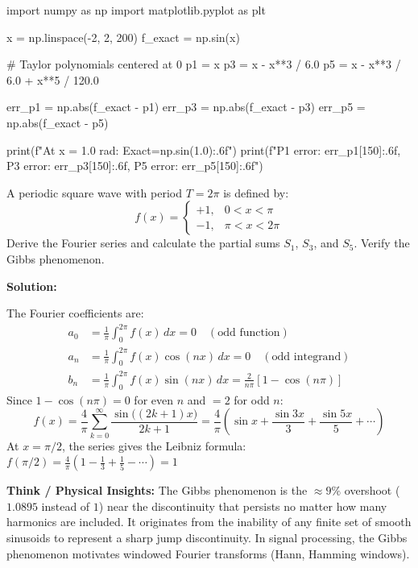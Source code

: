 \begin{pythonbox}
import numpy as np
import matplotlib.pyplot as plt

x = np.linspace(-2, 2, 200)
f_exact = np.sin(x)

# Taylor polynomials centered at 0
p1 = x
p3 = x - x**3 / 6.0
p5 = x - x**3 / 6.0 + x**5 / 120.0

err_p1 = np.abs(f_exact - p1)
err_p3 = np.abs(f_exact - p3)
err_p5 = np.abs(f_exact - p5)

print(f"At x = 1.0 rad: Exact={np.sin(1.0):.6f}")
print(f"P1 error: {err_p1[150]:.6f}, P3 error: {err_p3[150]:.6f}, P5 error: {err_p5[150]:.6f}")
\end{pythonbox}

\begin{psctexample}
A periodic square wave with period $T = 2\pi$ is defined by:
\[
f(x) = \begin{cases} +1, & 0 < x < \pi \\ -1, & \pi < x < 2\pi \end{cases}
\]
Derive the Fourier series and calculate the partial sums $S_1$, $S_3$, and $S_5$. Verify the Gibbs phenomenon.

\textbf{Solution:}

The Fourier coefficients are:
\begin{align}
a_0 &= \frac{1}{\pi}\int_0^{2\pi} f(x)\,dx = 0 \quad (\text{odd function}) \\
a_n &= \frac{1}{\pi}\int_0^{2\pi} f(x)\cos(nx)\,dx = 0 \quad (\text{odd integrand})\\
b_n &= \frac{1}{\pi}\int_0^{2\pi} f(x)\sin(nx)\,dx = \frac{2}{n\pi}[1 - \cos(n\pi)]
\end{align}
Since $1 - \cos(n\pi) = 0$ for even $n$ and $= 2$ for odd $n$:
\begin{equation}
\boxed{f(x) = \frac{4}{\pi}\sum_{k=0}^{\infty} \frac{\sin\bigl((2k+1)x\bigr)}{2k+1} = \frac{4}{\pi}\left(\sin x + \frac{\sin 3x}{3} + \frac{\sin 5x}{5} + \cdots\right)}
\end{equation}
At $x = \pi/2$, the series gives the Leibniz formula: $f(\pi/2) = \frac{4}{\pi}(1 - \frac{1}{3} + \frac{1}{5} - \cdots) = 1$ \checkmark

\textbf{\color{rbruNavy}Think / Physical Insights:}
The Gibbs phenomenon is the $\approx 9\%$ overshoot ($1.0895$ instead of $1$) near the discontinuity that persists no matter how many harmonics are included. It originates from the inability of any finite set of smooth sinusoids to represent a sharp jump discontinuity. In signal processing, the Gibbs phenomenon motivates windowed Fourier transforms (Hann, Hamming windows).
\qedexam
\end{psctexample}

